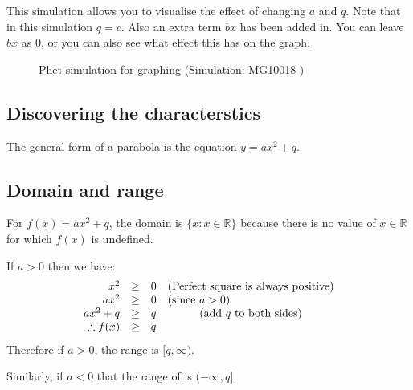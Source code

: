 This simulation allows you to visualise the effect of changing $a$ and $q$. Note that in this simulation $q = c$. Also an extra term $bx$ has been added in. You can leave $bx$ as $0$, or you can also see what effect this has on the graph.
\par 
\setcounter{subfigure}{0}
\begin{figure}[H] %
\textnormal{Phet simulation for graphing}\vspace{.1in} \nopagebreak
\label{m39345*phet!!!underscore!!!sim}\label{m39345*phet-simulation}
 { (Simulation:  MG10018 )}
\vspace{2pt}
\vspace{.1in}
\end{figure}       


\subsection*{Discovering the characterstics}
The general form of a parabola is the equation $y=ax^{2} + q$.
\subsection*{Domain and range}

For $f(x)=a{x}^{2}+q$, the domain is $\{x:x\in \mathbb{R}\}$ because there is no value of $x\in \mathbb{R}$ for which $f(x)$ is undefined.\par 
\par 
If $a>0$ then we have:
\begin{equation*}
\begin{array}{cccc}\hfill {x}^{2}& \ge & 0\hfill & (\mbox{Perfect square is always positive})\hfill \\
 \hfill a{x}^{2}& \ge & 0\hfill & (\mbox{since } a>0)\hfill \\
 \hfill a{x}^{2}+q& \ge & q\hfill & (\mbox{add $q$ to both sides}) \\
 \hfill \therefore f(x)& \ge & q\hfill & 
\end{array}
\end{equation*}
Therefore if $a>0$, the range is $[q,\infty )$.\par 
Similarly, if $a<0$ that the range of is $ (-\infty ,q]$. 

